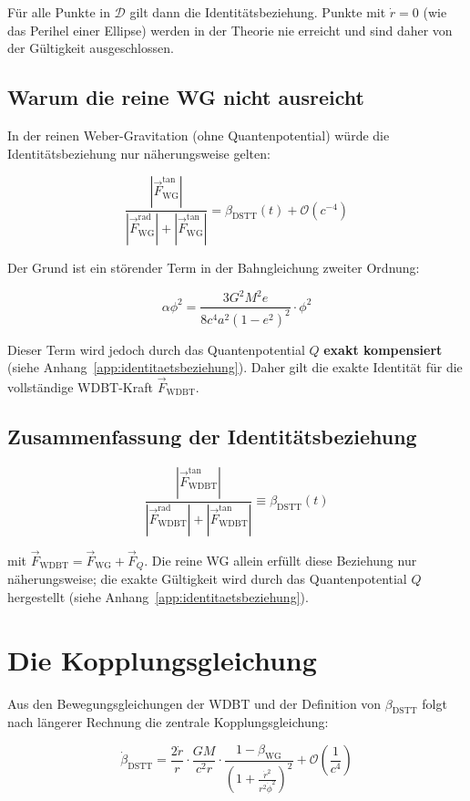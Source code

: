 Für alle Punkte in \(\mathcal{D}\) gilt dann die Identitätsbeziehung. Punkte mit \(\dot{r} = 0\) (wie das Perihel einer Ellipse) werden in der Theorie nie erreicht und sind daher von der Gültigkeit ausgeschlossen.

\subsection{Warum die reine WG nicht ausreicht}

In der reinen Weber-Gravitation (ohne Quantenpotential) würde die Identitätsbeziehung nur näherungsweise gelten:

\[
\frac{|\vec{F}_{\text{WG}}^{\text{tan}}|}{|\vec{F}_{\text{WG}}^{\text{rad}}| + |\vec{F}_{\text{WG}}^{\text{tan}}|} = \beta_{\text{DSTT}}(t) + \mathcal{O}(c^{-4})
\]

Der Grund ist ein störender Term in der Bahngleichung zweiter Ordnung:

\[
\alpha\phi^2 = \frac{3G^2M^2 e}{8c^4 a^2(1-e^2)^2} \cdot \phi^2
\]

Dieser Term wird jedoch durch das Quantenpotential \(Q\) \textbf{exakt kompensiert} (siehe Anhang~\ref{app:identitaetsbeziehung}). Daher gilt die exakte Identität für die vollständige WDBT-Kraft \(\vec{F}_{\text{WDBT}}\).

\subsection{Zusammenfassung der Identitätsbeziehung}

\[
\boxed{\frac{|\vec{F}_{\text{WDBT}}^{\text{tan}}|}{|\vec{F}_{\text{WDBT}}^{\text{rad}}| + |\vec{F}_{\text{WDBT}}^{\text{tan}}|} \equiv \beta_{\text{DSTT}}(t)}
\]

mit \(\vec{F}_{\text{WDBT}} = \vec{F}_{\text{WG}} + \vec{F}_Q\). Die reine WG allein erfüllt diese Beziehung nur näherungsweise; die exakte Gültigkeit wird durch das Quantenpotential \(Q\) hergestellt (siehe Anhang~\ref{app:identitaetsbeziehung}).

\section{Die Kopplungsgleichung}
\label{sec:kopplungsgleichung}

Aus den Bewegungsgleichungen der WDBT und der Definition von \(\beta_{\text{DSTT}}\) folgt nach längerer Rechnung die zentrale Kopplungsgleichung:

\[
\dot{\beta}_{\text{DSTT}} = \frac{2\dot{r}}{r} \cdot \frac{GM}{c^2 r} \cdot \frac{1 - \beta_{\text{WG}}}{\left(1 + \frac{\dot{r}^2}{r^2\dot{\phi}^2}\right)^2} + \mathcal{O}\left(\frac{1}{c^4}\right)
\]

